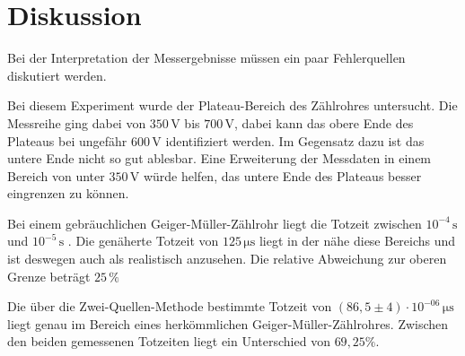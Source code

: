 \section{Diskussion}
\label{sec:Diskussion}

Bei der Interpretation der Messergebnisse müssen ein paar Fehlerquellen diskutiert werden.

Bei diesem Experiment wurde der Plateau-Bereich des Zählrohres untersucht. Die Messreihe ging dabei von $350 \,\unit{\volt}$ bis $700 \,\unit{\volt}$, dabei kann das obere Ende des Plateaus bei ungefähr $600 \, \unit{\volt}$ identifiziert werden.
Im Gegensatz dazu ist das untere Ende nicht so gut ablesbar. Eine Erweiterung der Messdaten in einem Bereich von unter $350 \, \unit{\volt}$ würde helfen, das untere Ende des Plateaus besser eingrenzen zu können.

Bei einem gebräuchlichen Geiger-Müller-Zählrohr liegt die Totzeit zwischen $10^{-4} \, \unit{\second}$ und $10^{-5} \, \unit{\second}$ \cite{ap01}.
Die genäherte Totzeit von $ 125 \,\unit{\micro\second}$ liegt in der nähe diese Bereichs und ist deswegen auch als realistisch anzusehen.
Die relative Abweichung zur oberen Grenze beträgt $25 \, \% $

Die über die Zwei-Quellen-Methode bestimmte Totzeit von $ \left( 86,5 \pm 4 \right) \cdot 10^{-06} \,\unit{\micro\second}$ liegt genau im Bereich eines herkömmlichen Geiger-Müller-Zählrohres.
Zwischen den beiden gemessenen Totzeiten liegt ein Unterschied von $ 69,25 \% .$

